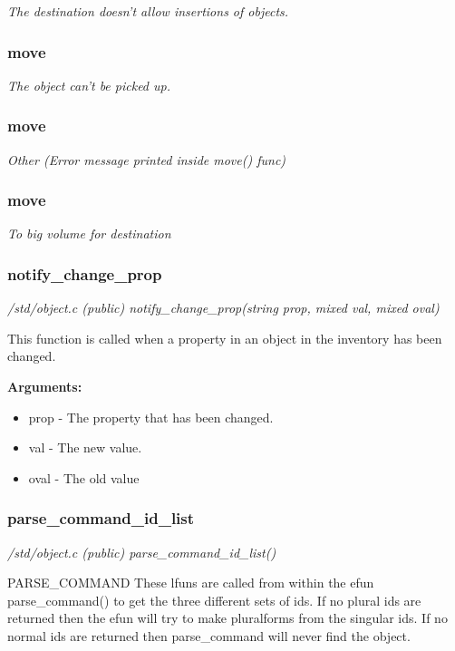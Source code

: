 {\em  The destination doesn't allow insertions of objects.}

\subsubsection{move}

{\em  The object can't be picked up.}

\subsubsection{move}

{\em  Other (Error message printed inside move() func)}

\subsubsection{move}

{\em  To big volume for destination}



\subsubsection{notify\_change\_prop}

{\em /std/object.c (public) notify\_change\_prop(string prop, mixed val, mixed oval)}

This function is called when a property in an object
in the inventory has been changed.

{\bf Arguments:}
\begin{itemize}
\item     prop - The property that has been changed.
\item val  - The new value.
\item oval - The old value
\end{itemize}


\subsubsection{parse\_command\_id\_list}

{\em /std/object.c (public) parse\_command\_id\_list()}

PARSE\_COMMAND
These lfuns are called from within the efun parse\_command() to get the
three different sets of ids. If no plural ids are returned then the
efun will try to make pluralforms from the singular ids.
If no normal ids are returned then parse\_command will never find the object.


